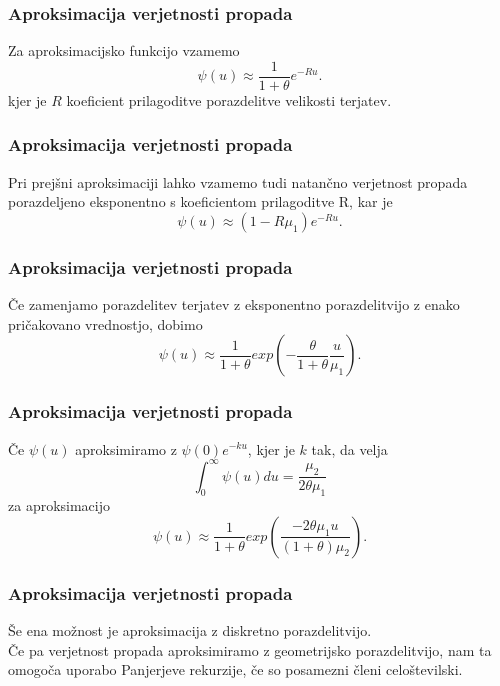 \documentclass{beamer}
\begin{document}
\begin{frame}
	\frametitle{Aproksimacija verjetnosti propada}
	Za aproksimacijsko funkcijo vzamemo
	\[
	\psi(u) \approx \frac{1}{1 + \theta} e^{-Ru}.
	\]
	kjer je $R$ koeficient prilagoditve porazdelitve velikosti terjatev.
\end{frame}

\begin{frame}
	\frametitle{Aproksimacija verjetnosti propada}
	Pri prejšni aproksimaciji lahko vzamemo tudi natančno verjetnost propada porazdeljeno eksponentno s koeficientom prilagoditve R, kar je
	\[
	\psi(u) \approx (1 - R\mu_1)e^{-Ru}.
	\]
\end{frame}

\begin{frame}
	\frametitle{Aproksimacija verjetnosti propada}
	Če zamenjamo porazdelitev terjatev z eksponentno porazdelitvijo z enako pričakovano vrednostjo, dobimo
	\[
	\psi(u) \approx \frac{1}{1 + \theta} exp(-\frac{\theta}{1+ \theta}\frac{u}{\mu_1}).
	\]
\end{frame}

\begin{frame}
	\frametitle{Aproksimacija verjetnosti propada}
	Če $\psi(u)$ aproksimiramo z $\psi(0)e^{-ku}$, kjer je $k$ tak, da velja 
	\[ \int_{0}^{\infty} \psi(u) du = \frac{\mu_2}{2\theta \mu_1}\]
	za aproksimacijo 
	\[
	\psi(u) \approx \frac{1}{1 + \theta} exp(\frac{-2\theta \mu_1 u}{(1 + \theta)\mu_2}).
	\]
\end{frame}

\begin{frame}
	\frametitle{Aproksimacija verjetnosti propada}
	Še ena možnost je aproksimacija z diskretno porazdelitvijo.
	\vspace{0.5cm}
	\\Če pa verjetnost propada aproksimiramo z geometrijsko porazdelitvijo, nam ta omogoča uporabo Panjerjeve rekurzije, če so posamezni členi celoštevilski.
\end{frame}
\end{document}
